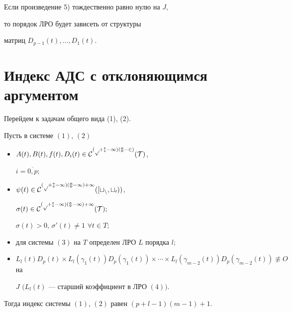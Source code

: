 \begin{note}


Если произведение 5) тождественно равно нулю на $J$,


то порядок ЛРО будет зависеть от структуры 


матриц $D_{p-1}(t),\dotsc,D_1(t)$.


\end{note}





\section{Индекс АДС с отклоняющимся аргументом} 





Перейдем к задачам общего вида (1), (2).





\begin{thmnonum}


Пусть в системе $(1)$, $(2)$


\begin{itemize}


\item[1)] $A(t),B(t),f(t),D_i(t) \in \cal C^{(p+l-1)(m-2)}(T)$,


$i=\overline{0,p};$


\item[2)] $\psi(t) \in \cal C^{(p+l-1)(m-1)+1}([t_n,t_0))$,


$\sigma(t) \in \cal C^{(p+l-1)(m-1)+1}(T);$ 


$\sigma (t)>0$, $\sigma'(t) \neq 1$ $\forall t \in T;$


\item[3)] для системы $(3)$ на $T$ определен ЛРО $L$ порядка $l;$


\item[4)] $L_l(t)D_p(t)\times L_l(\gamma_1(t))D_p(\gamma_1(t))\times\dotsb


\times L_l(\gamma_{m-2}(t))D_p(\gamma_{m-2}(t)) \not\equiv O$ на


$J$ $(L_l(t)$ --- старший коэффициент в ЛРО $(4))$.


\end{itemize}





Тогда индекс системы $(1)$, $(2)$ равен $(p+l-1)(m-1)+1$.


\end{thmnonum}





